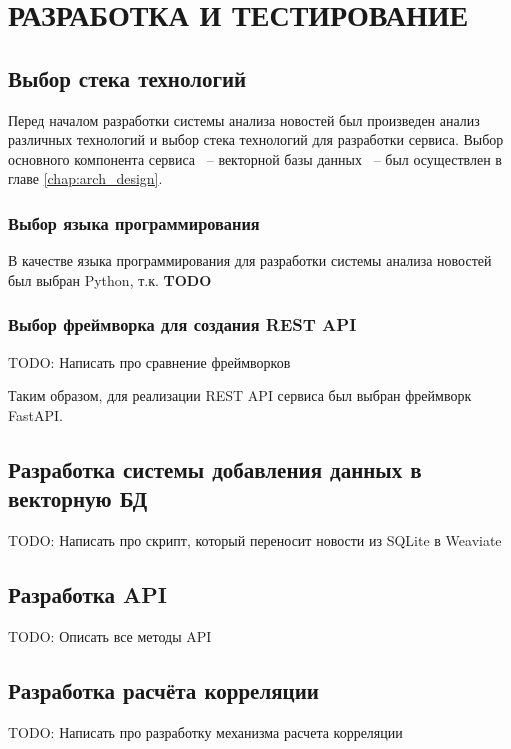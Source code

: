 \chapter{РАЗРАБОТКА И ТЕСТИРОВАНИЕ}
\aftertitle

\section{Выбор стека технологий}

Перед началом разработки системы анализа новостей был произведен анализ различных технологий и выбор стека технологий для разработки сервиса. Выбор основного компонента сервиса ~-- векторной базы данных ~-- был осуществлен в главе \ref{chap:arch_design}.

\subsection{Выбор языка программирования}

В качестве языка программирования для разработки системы анализа новостей был выбран Python, т.к. \textbf{TODO}


\subsection{Выбор фреймворка для создания REST API}

TODO: Написать про сравнение фреймворков

Таким образом, для реализации REST API сервиса был выбран фреймворк FastAPI.

\section{Разработка системы добавления данных в векторную БД}

TODO: Написать про скрипт, который переносит новости из SQLite в Weaviate

\section{Разработка API}

TODO: Описать все методы API

\section{Разработка расчёта корреляции}

TODO: Написать про разработку механизма расчета корреляции

